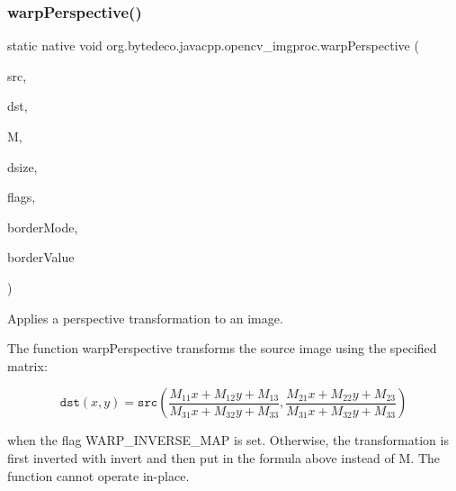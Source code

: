 \subsubsection{\texorpdfstring{warp\+Perspective()}{warpPerspective()}}
{\footnotesize\ttfamily static native void org.\+bytedeco.\+javacpp.\+opencv\+\_\+imgproc.\+warp\+Perspective (\begin{DoxyParamCaption}\item[{@By\+Val Mat}]{src,  }\item[{@By\+Val Mat}]{dst,  }\item[{@By\+Val Mat}]{M,  }\item[{@By\+Val Size}]{dsize,  }\item[{int}]{flags,  }\item[{int}]{border\+Mode,  }\item[{@Const @By\+Ref(null\+Value=\char`\"{}cv\+::\+Scalar()\char`\"{}) Scalar}]{border\+Value }\end{DoxyParamCaption})\hspace{0.3cm}{\ttfamily [static]}}



Applies a perspective transformation to an image. 

The function warp\+Perspective transforms the source image using the specified matrix\+: 

\[\texttt{dst} (x,y) = \texttt{src} \left ( \frac{M_{11} x + M_{12} y + M_{13}}{M_{31} x + M_{32} y + M_{33}} , \frac{M_{21} x + M_{22} y + M_{23}}{M_{31} x + M_{32} y + M_{33}} \right )\] 

when the flag W\+A\+R\+P\+\_\+\+I\+N\+V\+E\+R\+S\+E\+\_\+\+M\+AP is set. Otherwise, the transformation is first inverted with invert and then put in the formula above instead of M. The function cannot operate in-\/place. 


